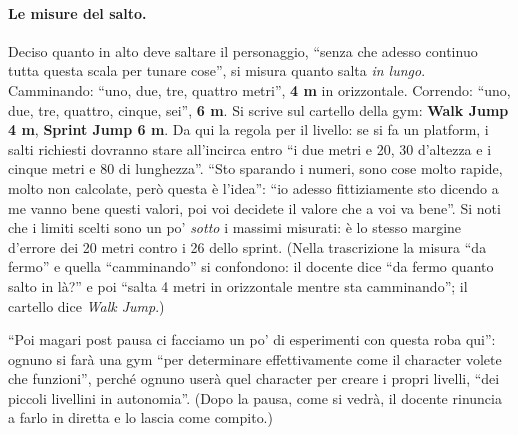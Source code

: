 \paragraph{Le misure del salto.} Deciso quanto in alto deve saltare il personaggio, ``senza
che adesso continuo tutta questa scala per tunare cose'', si misura quanto salta
\emph{in lungo}. Camminando: ``uno, due, tre, quattro metri'', \textbf{4 m} in orizzontale.
Correndo: ``uno, due, tre, quattro, cinque, sei'', \textbf{6 m}. Si scrive sul cartello
della gym: \textbf{Walk Jump 4 m}, \textbf{Sprint Jump 6 m}. Da qui la regola per il
livello: se si fa un platform, i salti richiesti dovranno stare all'incirca entro ``i due
metri e 20, 30 d'altezza e i cinque metri e 80 di lunghezza''. ``Sto sparando i numeri, sono
cose molto rapide, molto non calcolate, però questa è l'idea'': ``io adesso fittiziamente sto
dicendo a me vanno bene questi valori, poi voi decidete il valore che a voi va bene''. Si
noti che i limiti scelti sono un po' \emph{sotto} i massimi misurati: è lo stesso margine
d'errore dei 20 metri contro i 26 dello sprint. (Nella trascrizione la misura ``da fermo''
e quella ``camminando'' si confondono: il docente dice ``da fermo quanto salto in là?'' e
poi ``salta 4 metri in orizzontale mentre sta camminando''; il cartello dice \emph{Walk
Jump}.)

``Poi magari post pausa ci facciamo un po' di esperimenti con questa roba qui'': ognuno si
farà una gym ``per determinare effettivamente come il character volete che funzioni'',
perché ognuno userà quel character per creare i propri livelli, ``dei piccoli livellini in
autonomia''. (Dopo la pausa, come si vedrà, il docente rinuncia a farlo in diretta e lo
lascia come compito.)

